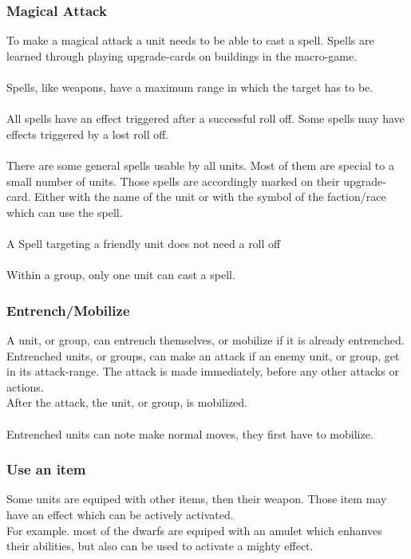 \documentclass[a5paper,pagesize,10pt,bibtotoc,pointlessnumbers,
normalheadings,DIV=9,twoside=false]{scrbook}
\begin{document}
\subsubsection{Magical Attack}
To make a magical attack a unit needs to be able to cast a spell. Spells are learned through playing upgrade-cards on buildings in the macro-game.\\
\\
Spells, like weapons, have a maximum range in which the target has to be.\\
\\
All spells have an effect triggered after a successful roll off. Some spells may have effects triggered by a lost roll off.\\
\\
There are some general spells usable by all units. Most of them are special to a small number of units. Those spells are accordingly marked on their upgrade-card. Either with the name of the unit or with the symbol of the faction/race which can use the spell.\\
\\
A Spell targeting a friendly unit does not need a roll off\\
\\
Within a group, only one unit can cast a spell.

\subsubsection{Entrench/Mobilize}
A unit, or group, can entrench themselves, or mobilize if it is already entrenched.
Entrenched units, or groups, can make an attack if an enemy unit, or group, get in its attack-range.
The attack is made immediately, before any other attacks or actions.\\
After the attack, the unit, or group, is mobilized.\\
\\
Entrenched units can note make normal moves, they first have to mobilize.

\subsubsection{Use an item}
Some units are equiped with other items, then their weapon. Those item may have an effect which can be actively activated.\\
For example. most of the dwarfs are equiped with an amulet which enhanves their abilities, but also can be used to activate a mighty effect.
\end{document}
